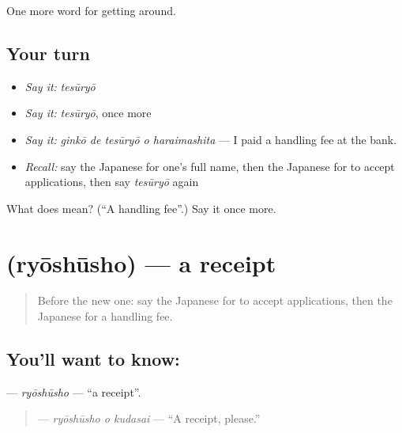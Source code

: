 \begin{grammarlens}[title={What you've built}]
One more word for getting around.
\end{grammarlens}

\subsection*{Your turn}
\begin{itemize}
\raggedright
  \item \emph{Say it:} \emph{tesūryō}
  \item \emph{Say it:} \emph{tesūryō}, once more
  \item \emph{Say it:} \emph{ginkō de tesūryō o haraimashita} — I paid a handling fee at the bank.
  \item \emph{Recall:} say the Japanese for one's full name, then the Japanese for to accept applications, then say \emph{tesūryō} again
\end{itemize}

\begin{tcolorbox}[breakable,colback=teal!4,colframe=teal!35!black,title={Before you move on}]
What does  mean? (\textquotedblleft{}A handling fee\textquotedblright{}.) Say it once more.
\end{tcolorbox}
\section[\texorpdfstring{\ja{りょうしゅうしょ} (ryōshūsho)}{りょうしゅうしょ (ryōshūsho)}]{ (ryōshūsho) — a receipt}

\label{lesson:JA-C420-ryoushuusho}



\begin{quote}
Before the new one: say the Japanese for to accept applications, then the Japanese for a handling fee.
\end{quote}

\subsection*{You'll want to know: }
\textbf{} — \emph{ryōshūsho} — \textquotedblleft{}a receipt\textquotedblright{}.

\begin{quote}
\textbf{ } — \emph{ryōshūsho o kudasai} — \textquotedblleft{}A receipt, please.\textquotedblright{}
\end{quote}

